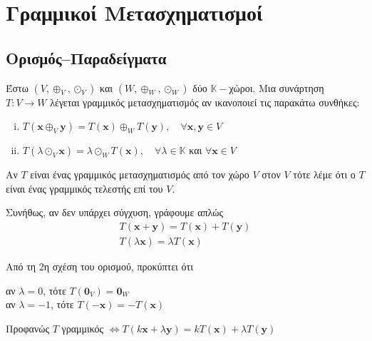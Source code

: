 




\pagestyle{vangelis}




\chapter{Γραμμικοί Μετασχηματισμοί}

\section{Ορισμός--Παραδείγματα}


\begin{dfn}
  Έστω $ (V, \oplus _{V}, \odot _{V}) $ και $ (W, \oplus _{W}, \odot _{W}) $ δύο 
  $ \mathbb{K} - $χώροι. Μια συνάρτηση $ T \colon V \to W $ λέγεται 
  \textcolor{Col1}{γραμμικός μετασχηματισμός} αν ικανοποιεί τις παρακάτω συνθήκες:
  \begin{enumerate}[(i)]
    \item $ T(\mathbf{x} \oplus _{V} \mathbf{y}) = T(\mathbf{x}) \oplus _{W}
      T(\mathbf{y}), \quad \forall \mathbf{x}, \mathbf{y}  \in V $
    \item $ T(\lambda \odot _{V} \mathbf{x}) = \lambda \odot _{W} T(\mathbf{x}), 
      \quad \forall \lambda \in \mathbb{K} $ και $ \forall \mathbf{x} \in V $
  \end{enumerate}
  Αν $T$ είναι ένας γραμμικός μετασχηματισμός από τον χώρο $V$ στον $V$ τότε λέμε 
  ότι ο $T$ είναι ένας \textcolor{Col1}{γραμμικός τελεστής} επί του $V$. 
\end{dfn}

\begin{rem}
\item {}
  \begin{myitemize}
    \item Συνήθως, αν δεν υπάρχει σύγχυση, γράφουμε απλώς 
        \begin{gather*}
          T(\mathbf{x}+ \mathbf{y}) = T(\mathbf{x}) + T(\mathbf{y}) \\
          T(\lambda \mathbf{x}) = \lambda T(\mathbf{x}) 
        \end{gather*}
    \item Από τη 2η σχέση του ορισμού, προκύπτει ότι
      \begin{center}
        αν $ \lambda = 0 $, τότε $ T(\mathbf{0}_{V}) = \mathbf{0}_{W} $ \\
        αν $ \lambda = -1 $, τότε $T(- \mathbf{x}) = - T(\mathbf{x}) $
      \end{center}
    \item Προφανώς $T$ γραμμικός $ \Leftrightarrow  T(k \mathbf{x} + \lambda 
      \mathbf{y}) =k T(\mathbf{x}) + \lambda T(\mathbf{y}) $
  \end{myitemize}
\end{rem}


